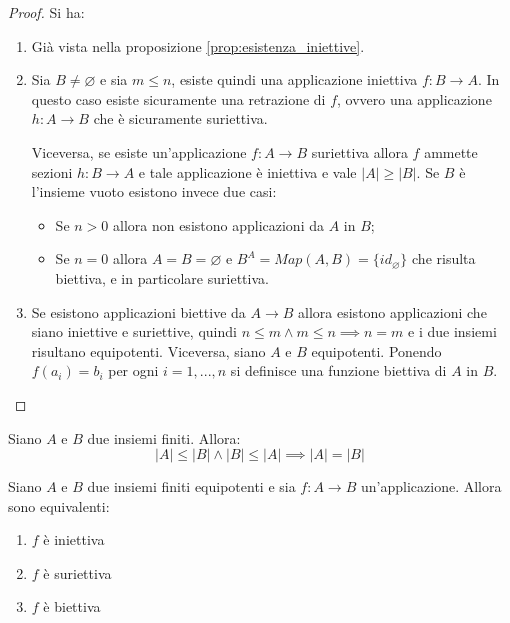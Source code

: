 \begin{proof}
	Si ha:
	\begin{enumerate}
		\item Già vista nella proposizione \ref{prop:esistenza_iniettive}.
		\item Sia $B \neq \varnothing$ e sia $m \leq n$, esiste quindi una applicazione iniettiva $f: B \rightarrow A$. In questo caso esiste sicuramente una retrazione di $f$, ovvero una applicazione $h: A \rightarrow B$ che è sicuramente suriettiva. 
		
		Viceversa, se esiste un'applicazione $f:A \rightarrow B$ suriettiva allora $f$ ammette sezioni $h:B \rightarrow A$ e tale applicazione è iniettiva e vale $|A| \geq |B|$. Se $B$ è l'insieme vuoto esistono invece due casi:
		\begin{itemize}
			\item Se $n>0$ allora non esistono applicazioni da $A$ in $B$;
			\item Se $n=0$ allora $A=B=\varnothing$ e $B^{A}= Map(A,B)=\{id_{\varnothing}\}$ che risulta biettiva, e in particolare suriettiva.
		\end{itemize}
		\item  Se esistono applicazioni biettive da $A \longrightarrow B$ allora esistono applicazioni che siano iniettive e suriettive, quindi $n \leq m \land m \leq n \implies n=m$ e i due insiemi risultano equipotenti. Viceversa, siano $A$ e $B$ equipotenti. Ponendo $f(a_{i})=b_{i}$ per ogni $i=1,...,n$ si definisce una funzione biettiva di $A$ in $B$.
	\end{enumerate}
\end{proof}

\begin{corolbox}
	Siano $A$ e $B$ due insiemi finiti. Allora: 
\begin{equation}
		|A|\leq |B| \land  |B| \leq |A| \implies |A|=|B|
\end{equation}
\end{corolbox}

\begin{teorbox}
	Siano $A$ e $B$ due insiemi finiti equipotenti e sia $f:A \rightarrow B$ un'applicazione. Allora sono equivalenti:
	\begin{enumerate}
		\item $f$ è iniettiva
		\item $f$ è suriettiva
		\item $f$ è biettiva
	\end{enumerate}
\end{teorbox}

